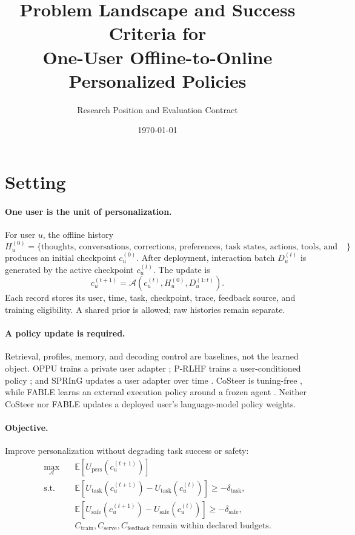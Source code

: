 \documentclass[11pt]{article}
\title{\bfseries Problem Landscape and Success Criteria for\\
One-User Offline-to-Online Personalized Policies}
\author{Research Position and Evaluation Contract}
\date{\today}
\newcommand{\utask}{U_{\mathrm{task}}}
\newcommand{\upers}{U_{\mathrm{pers}}}
\newcommand{\usafe}{U_{\mathrm{safe}}}
\newcommand{\cost}{C}
\newcommand{\history}{H_u^{(0)}}
\newcommand{\stream}{D_u^{(t)}}
\newcommand{\checkpoint}{c_u^{(t)}}
\begin{document}
\maketitle

\section{Setting}
\label{sec:setting}


\paragraph{One user is the unit of personalization.}
For user $u$, the offline history
\[
  \history
  =
  \{\text{thoughts, conversations, corrections, preferences,
  task states, actions, tools, and outcomes}\}
\]
produces an initial checkpoint $c_u^{(0)}$.  After deployment, interaction
batch $\stream$ is generated by the active checkpoint $\checkpoint$.
The update is
\begin{equation}
  c_u^{(t+1)}
  =
  \mathcal A\!\left(c_u^{(t)},\history,D_u^{(1:t)}\right).
  \label{eq:update}
\end{equation}
Each record stores its user, time, task, checkpoint, trace, feedback source,
and training eligibility.  A shared prior is allowed; raw histories remain
separate.

\paragraph{A policy update is required.}
Retrieval, profiles, memory, and decoding control are baselines, not the
learned object.  OPPU trains a private user adapter
\citep{tan2024oppu}; P-RLHF trains a user-conditioned policy
\citep{li2024personalized}; and SPRInG updates a user adapter over time
\citep{kim2026spring}.  CoSteer is tuning-free
\citep{lv2025costeer}, while FABLE learns an external execution policy around
a frozen agent \citep{jin2026fable}.  Neither CoSteer nor FABLE updates a
deployed user's language-model policy weights.

\paragraph{Objective.}
Improve personalization without degrading task success or safety:
\begin{align}
  \max_{\mathcal A}\quad&
  \mathbb E[\upers(c_u^{(t+1)})] \nonumber\\
  \text{s.t.}\quad&
  \mathbb E[\utask(c_u^{(t+1)})-\utask(c_u^{(t)})]
    \ge -\delta_{\mathrm{task}}, \nonumber\\
  &
  \mathbb E[\usafe(c_u^{(t+1)})-\usafe(c_u^{(t)})]
    \ge -\delta_{\mathrm{safe}}, \nonumber\\
  &
  \cost_{\mathrm{train}},\cost_{\mathrm{serve}},
  \cost_{\mathrm{feedback}}
  \ \text{remain within declared budgets}.
  \label{eq:constrained-objective}
\end{align}
\end{document}
